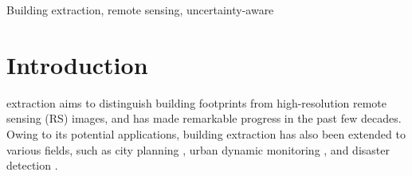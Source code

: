 \documentclass[lettersize,journal]{IEEEtran}
\begin{document}
\begin{IEEEkeywords}
Building extraction, remote sensing, uncertainty-aware
\end{IEEEkeywords}

\section{Introduction}
 extraction aims to distinguish building footprints from high-resolution remote sensing (RS) images, and has made remarkable progress in the past few decades. Owing to its potential applications, building extraction has also been extended to various fields, such as city planning \cite{urban_planning}, urban dynamic monitoring \cite{urban_monitor}, and disaster detection \cite{disaster_detection}.
\end{document}

